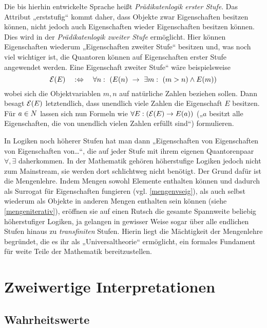 \begin{vorschau} \label{higherorder}
    Die bis hierhin entwickelte Sprache heißt \emph{Prädikatenlogik erster Stufe}. Das Attribut „erststufig“ kommt daher, dass Objekte zwar Eigenschaften besitzen können, nicht jedoch auch Eigenschaften wieder Eigenschaften besitzen können. Dies wird in der \emph{Prädikatenlogik zweiter Stufe} ermöglicht. Hier können Eigenschaften wiederum „Eigenschaften zweiter Stufe“ besitzen und, was noch viel wichtiger ist, die Quantoren können auf Eigenschaften erster Stufe angewendet werden. Eine Eigenschaft zweiter Stufe“ wäre beispielsweise
        \[ \calE(E) \quad:\Leftrightarrow\quad \forall n:\ (E(n)\ \to\ \exists m:\ (m>n)\land E(m)) \]
    wobei sich die Objektvariablen $m,n$ auf natürliche Zahlen beziehen sollen. Dann besagt $\mathcal E(E)$ letztendlich, dass unendlich viele Zahlen die Eigenschaft $E$ besitzen. Für $a\in \relax N$ lassen sich nun Formeln wie $\forall E:(\mathcal E(E)\to E(a))$ („$a$ besitzt alle Eigenschaften, die von unendlich vielen Zahlen erfüllt sind“) formulieren.

    In Logiken noch höherer Stufen hat man dann „Eigenschaften von Eigenschaften von Eigenschaften von\dots“, die auf jeder Stufe mit ihrem eigenen Quantorenpaar $\forall,\exists$ daherkommen. In der Mathematik gehören höherstufige Logiken jedoch nicht zum Mainstream, sie werden dort schlichtweg nicht benötigt. Der Grund dafür ist die Mengenlehre. Indem Mengen sowohl Elemente enthalten können und dadurch als Surrogat für Eigenschaften fungieren (vgl. \cref{mengenvseig}), als auch selbst wiederum als Objekte in anderen Mengen enthalten sein können (siehe \cref{mengeniterativ}), eröffnen sie auf einen Rutsch die gesamte Spannweite beliebig höherstufiger Logiken, ja gelangen in gewisser Weise sogar über alle endlichen Stufen hinaus zu \emph{transfiniten} Stufen. Hierin liegt die Mächtigkeit der Mengenlehre begründet, die es ihr als „Universaltheorie“ ermöglicht, ein formales Fundament für weite Teile der Mathematik bereitzustellen.
\end{vorschau}





\section{Zweiwertige Interpretationen}


\subsection*{Wahrheitswerte}


